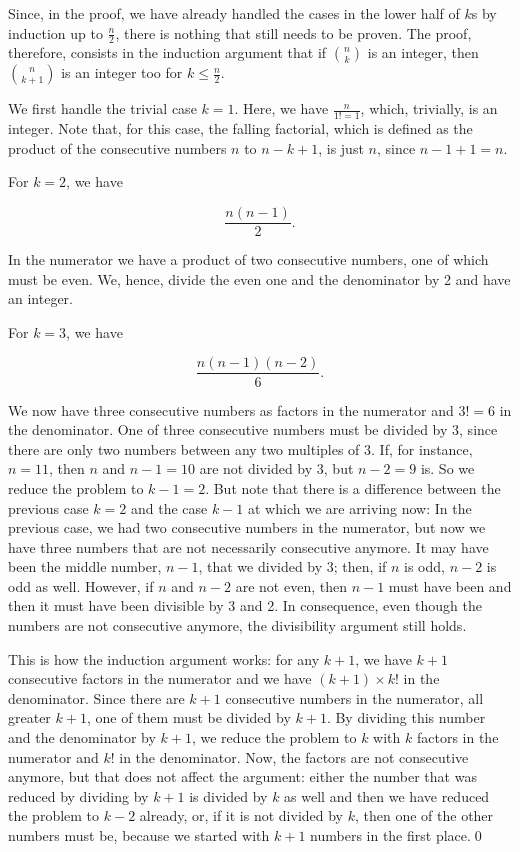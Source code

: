 \documentclass[tikz]{scrreprt}
\begin{document}
Since, in the proof, 
we have already handled the cases 
in the lower half of $k$s by induction up to $\frac{n}{2}$,
there is nothing that still needs to be proven.
The proof, therefore, consists in the induction argument
that if $\binom{n}{k}$ is an integer,
then $\binom{n}{k+1}$ is an integer too
for $k \le \frac{n}{2}$.

We first handle the trivial case
$k=1$. Here, we have $\frac{n}{1!=1}$,
which, trivially, is an integer.
Note that, for this case, the falling factorial,
which is defined as the product of the
consecutive numbers $n$ to $n-k+1$, 
is just $n$, since $n-1+1 = n$.

For $k=2$, we have

\[
\frac{n(n-1)}{2}.
\]

In the numerator we have 
a product of two consecutive numbers,
one of which must be even. 
We, hence, divide the even one
and the denominator by 2 and have an integer.

For $k=3$, we have

\[
\frac{n(n-1)(n-2)}{6}.
\]

We now have three consecutive numbers
as factors in the numerator and $3! = 6$
in the denominator. One of three consecutive 
numbers must be divided by 3, since there are only
two numbers between any two multiples of 3.
If, for instance, $n=11$, then $n$ and $n-1 = 10$
are not divided by 3, but $n-2=9$ is.
So we reduce the problem to $k-1=2$.
But note that there is a difference 
between the previous case $k=2$
and the case $k-1$ at which we are arriving now:
In the previous case, we had two consecutive numbers
in the numerator, but now we have three numbers
that are not necessarily consecutive anymore.
It may have been the middle number, $n-1$,
that we divided by 3; then, if $n$ is odd,
$n-2$ is odd as well.
However, if $n$ and $n-2$ are not even,
then $n-1$ must have been and then it must
have been divisible by 3 and 2.
In consequence, even though the numbers
are not consecutive anymore,
the divisibility argument still holds.

This is how the induction argument works:
for any $k+1$, we have $k+1$ consecutive
factors in the numerator and we have
$(k+1)\times k!$ in the 
denominator. Since there are $k+1$ consecutive numbers
in the numerator, all greater $k+1$, 
one of them must be divided by $k+1$.
By dividing this number and the denominator by $k+1$,
we reduce the problem to $k$ with $k$ factors
in the numerator and $k!$ in the denominator.
Now, the factors are not consecutive anymore,
but that does not affect the argument:
either the number that was reduced by dividing
by $k+1$ is divided by $k$ as well
and then we have reduced the problem to $k-2$ already,
or, if it is not divided by $k$, then 
one of the other numbers must be,
because we started with $k+1$ numbers in the first place.\qed
\end{document}
